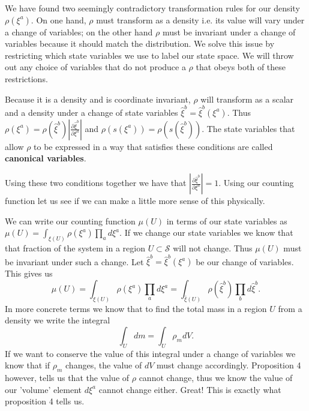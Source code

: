\documentclass{article}
\begin{document}

	We have found two seemingly contradictory transformation rules for our density $\rho(\xi^a)$. On one hand, $\rho$ must transform as a density i.e. its value will vary under a change of variables; on the other hand $\rho$ must be invariant under a change of variables because it should match the distribution. We solve this issue by restricting which state variables we use to label our state space. We will throw out any choice of variables that do not produce a $\rho$ that obeys both of these restrictions.
	

\begin{prop}
	Because it is a density and is coordinate invariant, $\rho$ will transform as a scalar and a density under a change of state variables $\hat{\xi}^b = \hat{\xi}^b(\xi^a)$. Thus $\rho(\xi^a) = \rho(\hat{\xi}^b)\left|\frac{\partial\hat{\xi}^b}{\partial\xi^a}\right|$ and $\rho(s(\xi^a)) = \rho(s(\hat{\xi}^b))$. The state variables that allow $\rho$ to be expressed in a way that satisfies these conditions are called \textbf{canonical variables}.
\end{prop}

	
	Using these two conditions together we have that $\left|\frac{\partial\hat{\xi}^b}{\partial\xi^a}\right| = 1$. Using our counting function let us see if we can make a little more sense of this physically.

	We can write our counting function $\mu(U)$ in terms of our state variables as $\mu(U) = \int_{\xi(U)} \rho(\xi^a) \prod_a d\xi^a$. If we change our state variables we know that that fraction of the system in a region $U \subset \mathcal{S}$ will not change. Thus $\mu(U)$ must be invariant under such a change. Let $\hat{\xi}^b = \hat{\xi}^b(\xi^a)$ be our change of variables. This gives us $$\mu(U) = \int_{\xi(U)} \rho(\xi^a) \prod_a d\xi^a = \int_{\hat{\xi}(U)} \rho(\hat{\xi}^b) \prod_b d\hat{\xi}^b.$$ 
	In more concrete terms we know that to find the total mass in a region $U$ from a density we write the integral $$\int_{U} dm = \int_{U} \rho_m dV.$$ If we want to conserve the value of this integral under a change of variables we know that if $\rho_m$ changes, the value of $dV$ must change accordingly. Proposition 4 however, tells us that the value of $\rho$ cannot change, thus we know the value of our 'volume' element $d\xi^a$ cannot change either. Great! This is exactly what proposition 4 tells us. 
	
\end{document}
